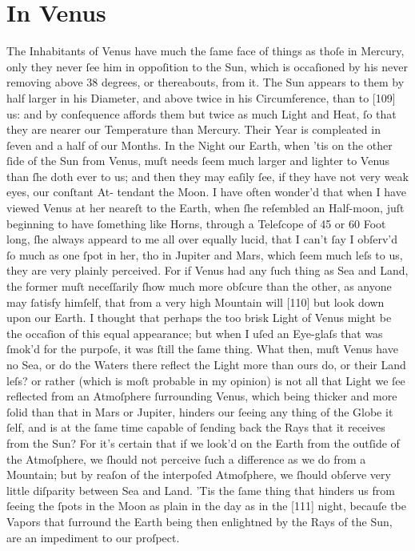 \documentclass[letterpaper]{book}
\begin{document}
\section{In Venus}

The Inhabitants of Venus have much the ſame face of things as thoſe in
Mercury, only they never ſee him in oppoſition to the Sun, which is
occaſioned by his never removing above 38 degrees, or thereabouts, from it.
The Sun appears to them by half larger in his Diameter, and above twice in
his Circumference, than to [109] us: and by conſequence affords them but
twice as much Light and Heat, ſo that they are nearer our Temperature than
Mercury. Their Year is compleated in ſeven and a half of our Months. In
the Night our Earth, when 'tis on the other ſide of the Sun from Venus, muſt
needs ſeem much larger and lighter to Venus than ſhe doth ever to us; and
then they may eaſily ſee, if they have not very weak eyes, our conſtant At-
tendant the Moon. I have often wonder'd that when I have viewed Venus at her
neareſt to the Earth, when ſhe reſembled an Half-moon, juſt beginning to
have ſomething like Horns, through a Teleſcope of 45 or 60 Foot long, ſhe
always appeard to me all over equally lucid, that I can't ſay I obſerv'd ſo
much as one ſpot in her, tho in Jupiter and Mars, which ſeem much leſs to
us, they are very plainly perceived. For if Venus had any ſuch thing as Sea
and Land, the former muſt neceſſarily ſhow much more obſcure than the other,
as anyone may ſatisfy himſelf, that from a very high Mountain will [110] but
look down upon our Earth. I thought that perhaps the too brisk Light of
Venus might be the occaſion of this equal appearance; but when I uſed an
Eye-glaſs that was ſmok'd for the purpoſe, it was ſtill the ſame thing. What
then, muſt Venus have no Sea, or do the Waters there reflect the Light more
than ours do, or their Land leſs? or rather (which is moſt probable in my
opinion) is not all that Light we ſee reflected from an Atmoſphere
ſurrounding Venus, which being thicker and more ſolid than that in Mars or
Jupiter, hinders our ſeeing any thing of the Globe it ſelf, and is at the
ſame time capable of ſending back the Rays that it receives from the Sun?
For it's certain that if we look'd on the Earth from the outſide of the
Atmoſphere, we ſhould not perceive ſuch a difference as we do from a
Mountain; but by reaſon of the interpoſed Atmoſphere, we ſhould obſerve very
little diſparity between Sea and Land. 'Tis the ſame thing that hinders us
from ſeeing the ſpots in the Moon as plain in the day as in the [111] night,
becauſe tbe Vapors that ſurround the Earth being then enlightned by the Rays
of the Sun, are an impediment to our proſpect.
\end{document}

